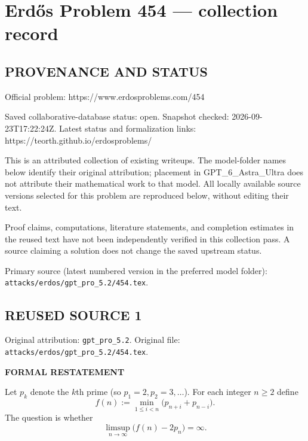 \section*{Erd\H{o}s Problem 454 --- collection record}

\subsection*{PROVENANCE AND STATUS}
Official problem: https://www.erdosproblems.com/454

Saved collaborative-database status: open.
Snapshot checked: 2026-09-23T17:22:24Z.
Latest status and formalization links: https://teorth.github.io/erdosproblems/

This is an attributed collection of existing writeups. The model-folder names below identify their original attribution; placement in GPT\_6\_Astra\_Ultra does not attribute their mathematical work to that model. All locally available source versions selected for this problem are reproduced below, without editing their text.

Proof claims, computations, literature statements, and completion estimates in the reused text have not been independently verified in this collection pass. A source claiming a solution does not change the saved upstream status.

Primary source (latest numbered version in the preferred model folder): \texttt{attacks/erdos/gpt\_pro\_5.2/454.tex}.

\subsection*{REUSED SOURCE 1}
Original attribution: \texttt{gpt\_pro\_5.2}.
Original file: \texttt{attacks/erdos/gpt\_pro\_5.2/454.tex}.


\textbf{FORMAL RESTATEMENT}

Let $p_k$ denote the $k$th prime (so $p_1=2,p_2=3,\dots$). For each integer $n\ge 2$ define
\[
f(n):=\min_{1\le i<n}\big(p_{n+i}+p_{n-i}\big).
\]
The question is whether
\[
\limsup_{n\to\infty}\big(f(n)-2p_n\big)=\infty.
\]

